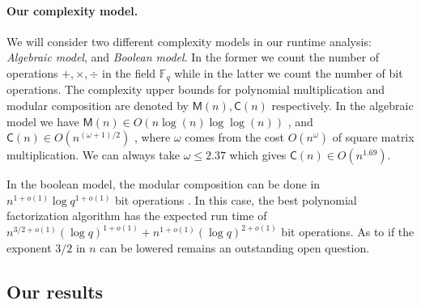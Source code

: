 \documentclass[12pt]{article}
\theoremstyle{plain}
\theoremstyle{definition}
\def\F{\ensuremath{\mathbb{F}}}
\def\MM{\ensuremath{\mathsf{M}}}
\def\CC{\ensuremath{\mathsf{C}}}
\begin{document}
\paragraph{Our complexity model.}
We will consider two different complexity models in our runtime analysis: \textit{Algebraic 
	model}, and \textit{Boolean model}. In the former we count the number of operations $+, \times, 
\div$ in the field $\F_q$ while in the latter we count the number of bit operations. The complexity 
upper bounds for polynomial multiplication and modular composition are denoted by $\MM(n), \CC(n)$ 
respectively. In the algebraic model we have $\MM(n) \in O(n\log(n)\log\log(n))$
\cite{Schonhage1971}, and $\CC(n) \in O(n^{(\omega+1)/2})$ \cite{BrKu78}, where $\omega$ comes 
from the cost $O(n^\omega)$ of square matrix multiplication. We can always take $\omega \le 2.37$ 
\cite{CoWi90} which gives $\CC(n) \in O(n^{1.69})$.

In the boolean model, the modular composition can be done in $n^{1 + o(1)}\log q^{1 + o(1)}$ bit 
operations \cite{ku}. In this case, the best polynomial factorization algorithm has the 
expected run time of $n^{3/2+o(1)} (\log q)^{1+o(1)}+n^{1+o(1)} (\log q)^{2+o(1)}$ bit operations. 
As to if the exponent $3/2$ in $n$ can be lowered remains an outstanding open question.


\subsection{Our results}
\end{document}
